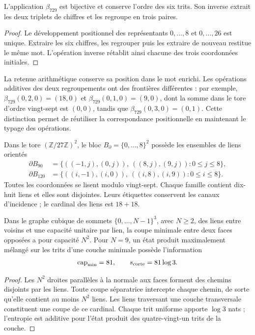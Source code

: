 \begin{proposition}
\label{x_reciprocidad:v:ant:prop:ii-area-beta729}
L'application \(\beta_{729}\) est bijective et conserve l'ordre des
six trits. Son inverse extrait les deux triplets de chiffres et les regroupe
en trois paires.
\end{proposition}
\begin{proof}
Le développement positionnel des représentants \(0,\ldots,8\) et
\(0,\ldots,26\) est unique. Extraire les six chiffres, les regrouper puis
les extraire de nouveau restitue le même mot. L'opération inverse
rétablit ainsi chacune des trois coordonnées initiales.
\end{proof}

La retenue arithmétique conserve sa position dans le mot enrichi. Les opérations
additives des deux regroupements ont des frontières différentes : par exemple,
\(\beta_{729}(0,2,0)=(18,0)\) et
\(\beta_{729}(0,1,0)=(9,0)\), dont la somme dans le tore d'ordre
vingt-sept est \((0,0)\), tandis que
\(\beta_{729}(0,3,0)=(0,1)\). Cette distinction permet de réutiliser
la correspondance positionnelle en maintenant le typage des opérations.

Dans le tore \((\mathbb Z/27\mathbb Z)^2\), le bloc
\(B_\partial=\{0,\ldots,8\}^2\) possède les ensembles de liens
orientés
\begin{align}
 \partial B_{90}
 &=\{((-1,j),(0,j)),\ ((8,j),(9,j)):0\le j\le8\},\\
 \partial B_{120}
 &=\{((i,-1),(i,0)),\ ((i,8),(i,9)):0\le i\le8\}.
 \label{x_reciprocidad:v:ant:eq:ii-area-enlaces}
\end{align}
Toutes les coordonnées se lisent modulo vingt-sept. Chaque famille contient
dix-huit liens et elles sont disjointes. Leurs étiquettes conservent les
canaux d'incidence ; le cardinal des liens est \(18+18\).

\begin{theorem}
\label{x_reciprocidad:v:ant:thm:ii-area-corte-minimo}
Dans le graphe cubique de sommets \(\{0,\ldots,N-1\}^3\), avec
\(N\ge2\), des liens entre voisins et une capacité unitaire par lien,
la coupe minimale entre deux faces opposées a pour capacité \(N^2\).
Pour \(N=9\), un état produit maximalement mélangé sur les
trits d'une couche minimale possède l'information
\begin{equation}
 \operatorname{cap}_{\min}=81,\qquad s_{\rm corte}=81\log3.
 \label{x_reciprocidad:v:ant:eq:ii-area-corte-informacion}
\end{equation}
\end{theorem}
\begin{proof}
Les \(N^2\) droites parallèles à la normale aux faces forment des chemins
disjoints par les liens. Toute coupe séparatrice intercepte chaque chemin, de
sorte qu'elle contient au moins \(N^2\) liens. Les liens traversant
une couche transversale constituent une coupe de ce cardinal. Chaque trit
uniforme apporte \(\log3\) nats ; l'entropie est additive pour l'état
produit des quatre-vingt-un trits de la couche.
\end{proof}

